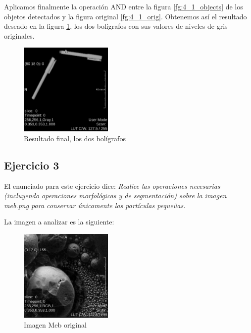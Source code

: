 \documentclass{article}
\begin{document}
\begin{par}
Aplicamos finalmente la operaci\'{o}n AND entre la figura \ref{fg:4_1_objects} de los objetos detectados y la figura original \ref{fg:4_1_orig}. Obtenemos as\'{i} el resultado deseado en la figura \ref{fg:4_1_final}, los dos bol\'{i}grafos con sus valores de niveles de gris originales.
\end{par}

\begin{figure}[ht]
\begin{center}
\includegraphics[width=0.4\textwidth]{4Sintesis/4_1_final} %
\caption{Resultado final, los dos bol\'{i}grafos}
\label{fg:4_1_final}
\end{center}
\end{figure}
\FloatBarrier


\subsection{Ejercicio 3}

\begin{par}
El enunciado para este ejercicio dice: \textit{Realice las operaciones necesarias
(incluyendo operaciones morfol\'{o}gicas y de segmentaci\'{o}n) sobre la imagen meb.png para
conservar \'{u}nicamente las part\'{i}culas peque\~{u}as.}
\end{par}
La imagen a analizar es la siguiente: 

\begin{figure}[ht]
\begin{center}
\includegraphics[width=0.4\textwidth]{4Sintesis/4_3_orig} %
\caption{Imagen Meb original}
\label{fg:4_3_orig}
\end{center}
\end{figure}
\FloatBarrier
\end{document}
